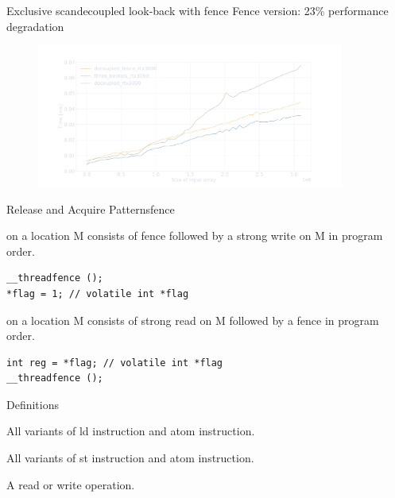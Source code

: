 \documentclass[aspectratio=169,compress]{beamer}
\begin{document}
\begin{frame}[fragile]{Exclusive scan}{decoupled look-back with fence}
Fence version: \textcolor{NordYellow}{23\%} performance degradation
\centering
	\begin{figure}
		\includegraphics[width=0.9\textwidth]{decoupled_fence.pdf}
	\end{figure}
\end{frame}

\begin{frame}[fragile]{Release and Acquire Patterns}{fence}
  \begin{description}
		\item[Release pattern] on a location M consists of fence followed by a 
			strong write on M in program order.

\begin{lstlisting}[]
__threadfence ();
*flag = 1; // volatile int *flag
\end{lstlisting}

		\item[Acquire pattern] on a location M consists of strong read on M followed
			by a fence in program order.

\begin{lstlisting}[]
int reg = *flag; // volatile int *flag
__threadfence ();
\end{lstlisting}
	\end{description}

\end{frame}

\begin{frame}{Definitions}
  \begin{description}
  \item[Read operation]
    All variants of \textcolor{NordYellow}{ld} instruction and \textcolor{NordYellow}{atom} instruction.
  \item[Write operation]
    All variants of \textcolor{NordYellow}{st} instruction and \textcolor{NordYellow}{atom} instruction.
  \item[Memory operation]
    A \textcolor{NordYellow}{read} or \textcolor{NordYellow}{write} operation.
  \end{description}
\end{frame}
\end{document}
